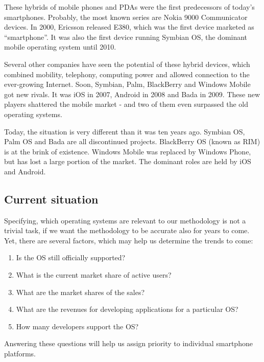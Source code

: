 \documentclass[english,master,public,dept460,male,cpdeclaration,oneside]{diploma}
\begin{document}
These hybrids of mobile phones and PDAs were the first predecessors of today’s smartphones. Probably, the most known series are Nokia 9000 Communicator devices. In 2000, Ericsson released E380, which was the first device marketed as “smartphone”. It was also the first device running Symbian OS, the dominant mobile operating system until 2010.

Several other companies have seen the potential of these hybrid devices, which combined mobility, telephony, computing power and allowed connection to the ever-growing Internet. Soon, Symbian, Palm, BlackBerry and Windows Mobile got new rivals. It was iOS in 2007, Android in 2008 and Bada in 2009. These new players shattered the mobile market - and two of them even surpassed the old operating systems. 

Today, the situation is very different than it was ten years ago. Symbian OS, Palm OS and Bada are all discontinued projects. BlackBerry OS (known as RIM) is at the brink of existence. Windows Mobile was replaced by Windows Phone, but has lost a large portion of the market. The dominant roles are held by iOS and Android.

\subsection{Current situation}
Specifying, which operating systems are relevant to our methodology is not a trivial task, if we want the methodology to be accurate also for years to come. Yet, there are several factors, which may help us determine the trends to come:
\begin{enumerate}
	\item Is the OS still officially supported?
	\item What is the current market share of active users?
	\item What are the market shares of the sales?
	\item What are the revenues for developing applications for a particular OS?
	\item How many developers support the OS?
\end{enumerate}
Answering these questions will help us assign priority to individual smartphone platforms. 
\end{document}
